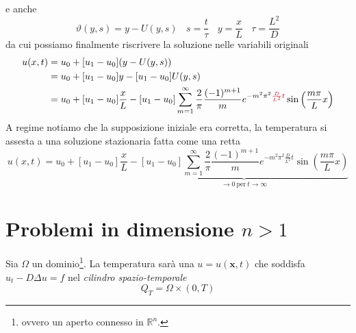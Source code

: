 \documentclass[10pt,a4paper,twoside,openright]{book}
\newcommand{\x}{\mathbf{x}}
\begin{document}
e anche
\begin{equation*}
    \vartheta(y,s) =y-U(y,s) \ \ \ \ s=\frac{t}{\tau } \ \ \ \ y=\frac{x}{L} \ \ \ \ \tau =\frac{L^{2}}{D}
\end{equation*}
da cui possiamo finalmente riscrivere la soluzione nelle variabili originali
\begin{align*}
    u(x,t) & =u_{0} +[ u_{1} -u_{0}](y-U(y,s))                                                                                                                                                                                                                         \\
           & =u_{0} +[ u_{1} -u_{0}] y-[ u_{1} -u_{0}] U(y,s)                                                                                                                                                                                                          \\
           & =u_{0} +[ u_{1} -u_{0}]\frac{x}{L} -[ u_{1} -u_{0}]\sum\limits ^{\infty }_{m=1}\frac{2}{\pi }\frac{(-1)^{m+1}}{m} e^{-m^{2} \pi ^{2}\textcolor[rgb]{0.82,0.01,0.11}{\frac{D}{L^{2}}}\textcolor[rgb]{0.82,0.01,0.11}{t}}\sin\left(\frac{m\pi }{L} x\right)
\end{align*}
A regime notiamo che la supposizione iniziale era corretta, la temperatura si assesta a una soluzione stazionaria fatta come una retta
\begin{equation*}
    u(x,t) =u_{0} +[ u_{1} -u_{0}]\frac{x}{L} -\underbrace{[ u_{1} -u_{0}]\sum\limits ^{\infty }_{m=1}\frac{2}{\pi }\frac{(-1)^{m+1}}{m} e^{-m^{2} \pi ^{2}\frac{D}{L^{2}} t}\sin\left(\frac{m\pi }{L} x\right)}_{\rightarrow 0\ \text{per} \ t\rightarrow \infty }
\end{equation*}


\section{Problemi in dimensione \texorpdfstring{$n>1$}{n>1}}

Sia $\displaystyle \Omega $ un dominio\footnote{ovvero un aperto connesso in $\displaystyle \mathbb{R}^{n}$.}. La temperatura sarà una $u=u(\x,t)$ che soddisfa $u_{t} -D\Delta u=f$ nel \textit{cilindro spazio-temporale}
\begin{equation*}
    Q_{T} =\Omega \times (0,T)
\end{equation*}

\end{document}
